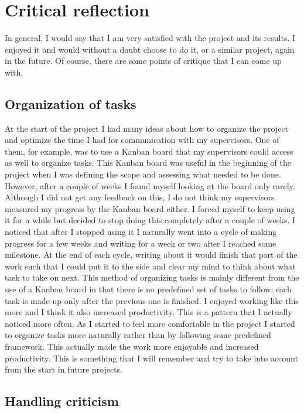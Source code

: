 \documentclass[]{article}
\begin{document}
\section{Critical reflection}

In general, I would say that I am very satisfied with the project and its results. I enjoyed it and would without a doubt choose to do it, or a similar project, again in the future. Of course, there are some points of critique that I can come up with.

\subsection{Organization of tasks}

At the start of the project I had many ideas about how to organize the project and optimize the time I had for communication with my supervisors. One of them, for example, was to use a Kanban board that my supervisors could access as well to organize tasks. This Kanban board was useful in the beginning of the project when I was defining the scope and assessing what needed to be done. However, after a couple of weeks I found myself looking at the board only rarely. Although I did not get any feedback on this, I do not think my supervisors measured my progress by the Kanban board either. I forced myself to keep using it for a while but decided to stop doing this completely after a couple of weeks. I noticed that after I stopped using it I naturally went into a cycle of making progress for a few weeks and writing for a week or two after I reached some milestone. At the end of each cycle, writing about it would finish that part of the work such that I could put it to the side and clear my mind to think about what task to take on next. This method of organizing tasks is mainly different from the use of a Kanban board in that there is no predefined set of tasks to follow; each task is made up only after the previous one is finished. I enjoyed working like this more and I think it also increased productivity. This is a pattern that I actually noticed more often. As I started to feel more comfortable in the project I started to organize tasks more naturally rather than by following some predefined framework. This actually made the work more enjoyable and increased productivity. This is something that I will remember and try to take into account from the start in future projects.

\subsection{Handling criticism}
\end{document}
